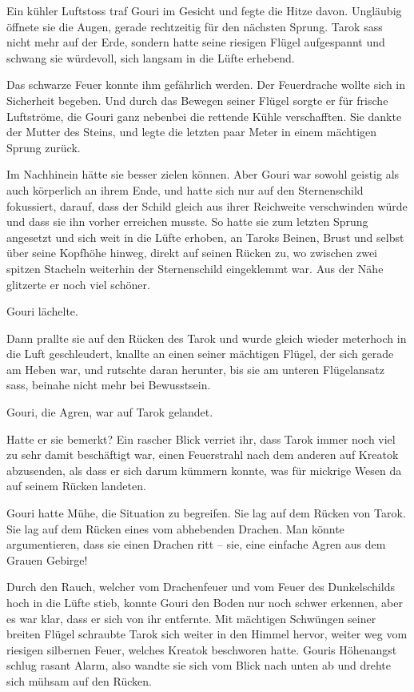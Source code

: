 Ein kühler Luftstoss traf Gouri im Gesicht und fegte die Hitze davon. Ungläubig öffnete sie die Augen, gerade rechtzeitig für den nächsten Sprung. Tarok sass nicht mehr auf der Erde, sondern hatte seine riesigen Flügel aufgespannt und schwang sie würdevoll, sich langsam in die Lüfte erhebend.

Das schwarze Feuer konnte ihm gefährlich werden. Der Feuerdrache wollte sich in Sicherheit begeben. Und durch das Bewegen seiner Flügel sorgte er für frische Luftströme, die Gouri ganz nebenbei die rettende Kühle verschafften. Sie dankte der Mutter des Steins, und legte die letzten paar Meter in einem mächtigen Sprung zurück.

Im Nachhinein hätte sie besser zielen können. Aber Gouri war sowohl geistig als auch körperlich an ihrem Ende, und hatte sich nur auf den Sternenschild fokussiert, darauf, dass der Schild gleich aus ihrer Reichweite verschwinden würde und dass sie ihn vorher erreichen musste. So hatte sie zum letzten Sprung angesetzt und sich weit in die Lüfte erhoben, an Taroks Beinen, Brust und selbst über seine Kopfhöhe hinweg, direkt auf seinen Rücken zu, wo zwischen zwei spitzen Stacheln weiterhin der Sternenschild eingeklemmt war. Aus der Nähe glitzerte er noch viel schöner.

Gouri lächelte.

Dann prallte sie auf den Rücken des Tarok und wurde gleich wieder meterhoch in die Luft geschleudert, knallte an einen seiner mächtigen Flügel, der sich gerade am Heben war, und rutschte daran herunter, bis sie am unteren Flügelansatz sass, beinahe nicht mehr bei Bewusstsein.

Gouri, die Agren, war auf Tarok gelandet.

Hatte er sie bemerkt? Ein rascher Blick verriet ihr, dass Tarok immer noch viel zu sehr damit beschäftigt war, einen Feuerstrahl nach dem anderen auf Kreatok abzusenden, als dass er sich darum kümmern konnte, was für mickrige Wesen da auf seinem Rücken landeten.

Gouri hatte Mühe, die Situation zu begreifen. Sie lag auf dem Rücken von Tarok. Sie lag auf dem Rücken eines vom abhebenden Drachen. Man könnte argumentieren, dass sie einen Drachen ritt – sie, eine einfache Agren aus dem Grauen Gebirge!

Durch den Rauch, welcher vom Drachenfeuer und vom Feuer des Dunkelschilds hoch in die Lüfte stieb, konnte Gouri den Boden nur noch schwer erkennen, aber es war klar, dass er sich von ihr entfernte. Mit mächtigen Schwüngen seiner breiten Flügel schraubte Tarok sich weiter in den Himmel hervor, weiter weg vom riesigen silbernen Feuer, welches Kreatok beschworen hatte. Gouris Höhenangst schlug rasant Alarm, also wandte sie sich vom Blick nach unten ab und drehte sich mühsam auf den Rücken.

